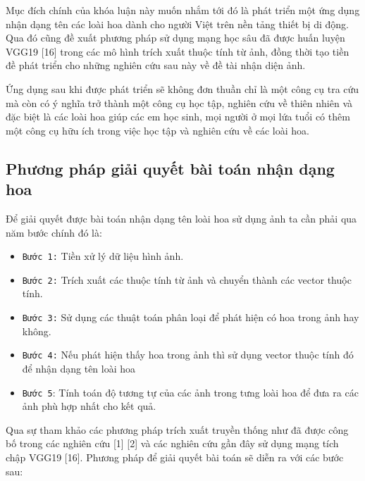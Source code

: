 \documentclass[12pt]{report}
\begin{document}
		Mục đích chính của khóa luận này muốn nhắm tới đó là phát triển một ứng dụng nhận dạng tên các loài hoa dành cho người Việt trên nền tảng thiết bị di động. Qua đó cũng đề xuất phương pháp sử dụng mạng học sâu đã được huấn luyện VGG19 [16] trong các mô hình trích xuất thuộc tính từ ảnh, đồng thời tạo tiền đề phát triển cho những nghiên cứu sau này về đề tài nhận diện ảnh.
																																																																		
		Ứng dụng sau khi được phát triển sẽ không đơn thuần chỉ là một công cụ tra cứu mà còn có ý nghĩa trở thành một công cụ học tập, nghiên cứu về thiên nhiên và đặc biệt là các loài hoa giúp các em học sinh, mọi người ở mọi lứa tuổi có thêm một công cụ hữu ích trong việc học tập và nghiên cứu về các loài hoa.
																																																																		
		\subsection{Phương pháp giải quyết bài toán nhận dạng hoa}
																																																																
		Để giải quyết được bài toán nhận dạng tên loài hoa sử dụng ảnh ta cần phải qua năm bước chính đó là:
																																																																
		\begin{itemize}
			\item \texttt{Bước 1:} Tiền xử lý dữ liệu hình ảnh.
			\item \texttt{Bước 2:} Trích xuất các thuộc tính từ ảnh và chuyển thành các vector thuộc tính.
			\item \texttt{Bước 3:} Sử dụng các thuật toán phân loại để phát hiện có hoa trong ảnh hay không.
			\item \texttt{Bước 4:}	Nếu phát hiện thấy hoa trong ảnh thì sử dụng vector thuộc tính đó để nhận dạng tên loài hoa
			\item \texttt{Bước 5}: Tính toán độ tương tự của các ảnh trong tưng loài hoa để đưa ra các ảnh phù hợp nhất cho kết quả.
		\end{itemize}
																																																														
		Qua sự tham khảo các phương pháp trích xuất truyền thống như đã được công bố trong các nghiên cứu [1] [2] và các nghiên cứu gần đây sử dụng mạng tích chập VGG19 [16]. Phương pháp để giải quyết bài toán sẽ diễn ra với các bước sau:
																																																														
\end{document}
